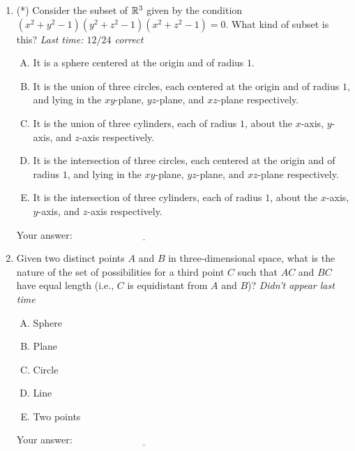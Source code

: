 \documentclass[10pt]{amsart}
\begin{document}
\begin{enumerate}

\item (*) Consider the subset of $\mathbb{R}^3$ given by the condition $(x^2 +
  y^2 - 1)(y^2 + z^2 - 1)(x^2 + z^2 - 1) = 0$. What kind of subset is
  this? {\em Last time: $12/24$ correct}

  \begin{enumerate}[(A)]
  \item It is a sphere centered at the origin and of radius $1$.
  \item It is the union of three circles, each centered at the origin
    and of radius $1$, and lying in the $xy$-plane, $yz$-plane, and
    $xz$-plane respectively.
  \item It is the union of three cylinders, each of radius $1$, about
    the $x$-axis, $y$-axis, and $z$-axis respectively.
  \item It is the intersection of three circles, each centered at the origin
    and of radius $1$, and lying in the $xy$-plane, $yz$-plane, and
    $xz$-plane respectively.
  \item It is the intersection of three cylinders, each of radius $1$, about
    the $x$-axis, $y$-axis, and $z$-axis respectively.
  \end{enumerate}

  \vspace{0.1in}
  Your answer: $\underline{\qquad\qquad\qquad\qquad\qquad\qquad\qquad}$
  \vspace{0.1in}

\item Given two distinct points $A$ and $B$ in three-dimensional
  space, what is the nature of the set of possibilities for a third
  point $C$ such that $AC$ and $BC$ have equal length (i.e., $C$ is
  equidistant from $A$ and $B$)? {\em Didn't appear last time}

  \begin{enumerate}[(A)]
  \item Sphere
  \item Plane
  \item Circle
  \item Line
  \item Two points
  \end{enumerate}

  \vspace{0.1in}
  Your answer: $\underline{\qquad\qquad\qquad\qquad\qquad\qquad\qquad}$
  \vspace{0.1in}


\end{enumerate}
\end{document}
